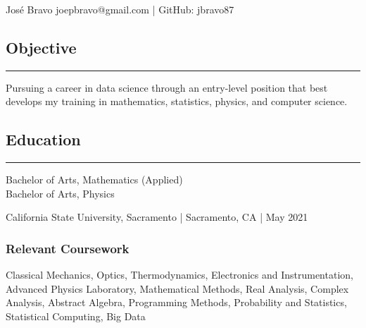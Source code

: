 \documentclass[letterpaper, 10 pt]{article}
\begin{document}
\centerline{\huge Jos\'e Bravo \hfill \normalsize joepbravo@gmail.com | GitHub: jbravo87}

\subsection*{Objective}
\noindent\rule[0.75ex]{\linewidth}{0.55 pt}
Pursuing a career in data science through an entry-level position that best develops my training in mathematics, statistics, physics, and computer science.


\subsection*{Education}
\noindent\rule[0.75ex]{\linewidth}{0.55 pt}
Bachelor of Arts, Mathematics (Applied) \\
Bachelor of Arts, Physics

California State University, Sacramento | Sacramento, CA | May 2021 %
\subsubsection*{Relevant Coursework}
\quad Classical Mechanics, Optics, Thermodynamics, Electronics and Instrumentation, Advanced Physics Laboratory, Mathematical Methods, Real Analysis, Complex Analysis, Abstract Algebra, Programming Methods, Probability and Statistics, Statistical Computing, Big Data %
\end{document}
